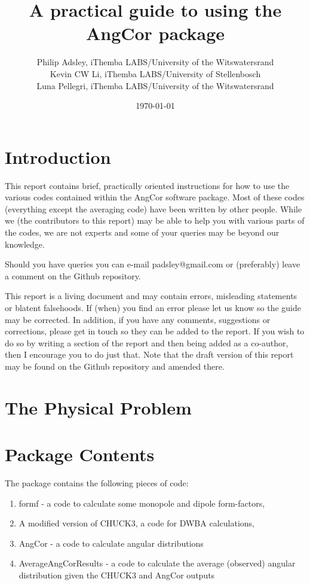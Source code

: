 \documentclass[a4paper,10pt]{article}
\title{A practical guide to using the AngCor package}
\author{Philip Adsley, iThemba LABS/University of the Witswatersrand\\
Kevin CW Li, iThemba LABS/University of Stellenbosch\\
Luna Pellegri, iThemba LABS/University of the Witswatersrand}
\date{\today}
\begin{document}
\lstset{language=bash}
\maketitle

\section{Introduction}

This report contains brief, practically oriented instructions for how to use the various codes contained within the AngCor software package. Most of these codes (everything except the averaging code) have been written by other people. While we (the contributors to this report) may be able to help you with various parts of the codes, we are not experts and some of your queries may be beyond our knowledge.

Should you have queries you can e-mail padsley@gmail.com or (preferably) leave a comment on the Github repository.

This report is a living document and may contain errors, misleading statements or blatent falsehoods. If (when) you find an error please let us know so the guide may be corrected. In addition, if you have any comments, suggestions or corrections, please get in touch so they can be added to the report. If you wish to do so by writing a section of the report and then being added as a co-author, then I encourage you to do just that. Note that the draft version of this report may be found on the Github repository and amended there.

\section{The Physical Problem}

\section{Package Contents}

The package contains the following pieces of code:

\begin{enumerate}
 \item formf - a code to calculate some monopole and dipole form-factors,
 \item A modified version of CHUCK3, a code for DWBA calculations,
 \item AngCor - a code to calculate angular distributions
 \item AverageAngCorResults - a code to calculate the average (observed) angular distribution given the CHUCK3 and AngCor outputs
\end{enumerate}
\end{document}

